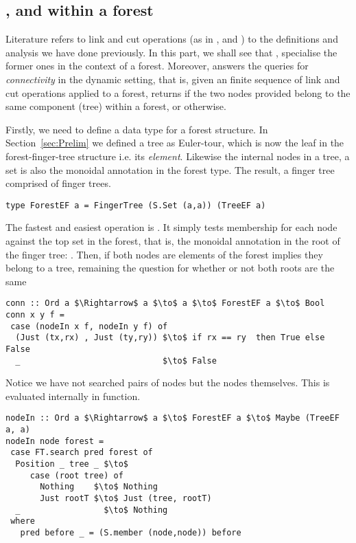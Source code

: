 \subsection{\link, \cut and \conn within a forest} 
Literature refers to link and cut operations (as in \cite{DS-DynTs}, \cite{WerneckR-PhD} and \cite{Rand-DynGs-Algos}) to the definitions and analysis we have done previously. In this part, we shall see that \link, \cut specialise the former ones in the context of a forest. Moreover, \conn answers the queries for \textit{connectivity} in the dynamic setting, that is, given an finite sequence of link and cut operations applied to a forest, \conn returns  if the two nodes provided belong to the same component (tree) within a forest, or  otherwise. 

Firstly, we need to define a data type for a forest structure. In Section~\ref{sec:Prelim} we defined a tree as Euler-tour, which is now the leaf in the forest-finger-tree structure i.e. its \textit{element}. Likewise the internal nodes in a tree, a set is also the monoidal annotation in the forest type. The result, a finger tree comprised of finger trees.
\begin{lstlisting}[mathescape] 
type ForestEF a = FingerTree (S.Set (a,a)) (TreeEF a) 
\end{lstlisting} 

The fastest and easiest operation is \conn. It simply tests membership for each node against the top set in the forest, that is, the monoidal annotation in the root of the finger tree: . Then, if both nodes are elements of the forest implies they belong to a tree, remaining the question for whether or not both roots are the same
\begin{lstlisting}[mathescape]
conn :: Ord a $\Rightarrow$ a $\to$ a $\to$ ForestEF a $\to$ Bool
conn x y f =
 case (nodeIn x f, nodeIn y f) of 
  (Just (tx,rx) , Just (ty,ry)) $\to$ if rx == ry  then True else False
  _                             $\to$ False
\end{lstlisting}

Notice we have not searched pairs of nodes but the nodes themselves. This is evaluated internally in  function.
\begin{lstlisting}[mathescape]
nodeIn :: Ord a $\Rightarrow$ a $\to$ ForestEF a $\to$ Maybe (TreeEF a, a) 
nodeIn node forest = 
 case FT.search pred forest of 
  Position _ tree _ $\to$
     case (root tree) of
       Nothing    $\to$ Nothing 
       Just rootT $\to$ Just (tree, rootT) 
  _                 $\to$ Nothing    
 where
   pred before _ = (S.member (node,node)) before 
\end{lstlisting} 

